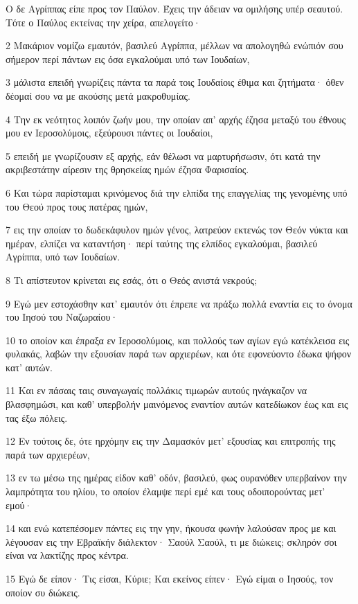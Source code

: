 \par Ο δε Αγρίππας είπε προς τον Παύλον. Έχεις την άδειαν να ομιλήσης υπέρ σεαυτού. Τότε ο Παύλος εκτείνας την χείρα, απελογείτο·
\par 2 Μακάριον νομίζω εμαυτόν, βασιλεύ Αγρίππα, μέλλων να απολογηθώ ενώπιόν σου σήμερον περί πάντων εις όσα εγκαλούμαι υπό των Ιουδαίων,
\par 3 μάλιστα επειδή γνωρίζεις πάντα τα παρά τοις Ιουδαίοις έθιμα και ζητήματα· όθεν δέομαί σου να με ακούσης μετά μακροθυμίας.
\par 4 Την εκ νεότητος λοιπόν ζωήν μου, την οποίαν απ' αρχής έζησα μεταξύ του έθνους μου εν Ιεροσολύμοις, εξεύρουσι πάντες οι Ιουδαίοι,
\par 5 επειδή με γνωρίζουσιν εξ αρχής, εάν θέλωσι να μαρτυρήσωσιν, ότι κατά την ακριβεστάτην αίρεσιν της θρησκείας ημών έζησα Φαρισαίος.
\par 6 Και τώρα παρίσταμαι κρινόμενος διά την ελπίδα της επαγγελίας της γενομένης υπό του Θεού προς τους πατέρας ημών,
\par 7 εις την οποίαν το δωδεκάφυλον ημών γένος, λατρεύον εκτενώς τον Θεόν νύκτα και ημέραν, ελπίζει να καταντήση· περί ταύτης της ελπίδος εγκαλούμαι, βασιλεύ Αγρίππα, υπό των Ιουδαίων.
\par 8 Τι απίστευτον κρίνεται εις εσάς, ότι ο Θεός ανιστά νεκρούς;
\par 9 Εγώ μεν εστοχάσθην κατ' εμαυτόν ότι έπρεπε να πράξω πολλά εναντία εις το όνομα του Ιησού του Ναζωραίου·
\par 10 το οποίον και έπραξα εν Ιεροσολύμοις, και πολλούς των αγίων εγώ κατέκλεισα εις φυλακάς, λαβών την εξουσίαν παρά των αρχιερέων, και ότε εφονεύοντο έδωκα ψήφον κατ' αυτών.
\par 11 Και εν πάσαις ταις συναγωγαίς πολλάκις τιμωρών αυτούς ηνάγκαζον να βλασφημώσι, και καθ' υπερβολήν μαινόμενος εναντίον αυτών κατεδίωκον έως και εις τας έξω πόλεις.
\par 12 Εν τούτοις δε, ότε ηρχόμην εις την Δαμασκόν μετ' εξουσίας και επιτροπής της παρά των αρχιερέων,
\par 13 εν τω μέσω της ημέρας είδον καθ' οδόν, βασιλεύ, φως ουρανόθεν υπερβαίνον την λαμπρότητα του ηλίου, το οποίον έλαμψε περί εμέ και τους οδοιπορούντας μετ' εμού·
\par 14 και ενώ κατεπέσομεν πάντες εις την γην, ήκουσα φωνήν λαλούσαν προς με και λέγουσαν εις την Εβραϊκήν διάλεκτον· Σαούλ Σαούλ, τι με διώκεις; σκληρόν σοι είναι να λακτίζης προς κέντρα.
\par 15 Εγώ δε είπον· Τις είσαι, Κύριε; Και εκείνος είπεν· Εγώ είμαι ο Ιησούς, τον οποίον συ διώκεις.
